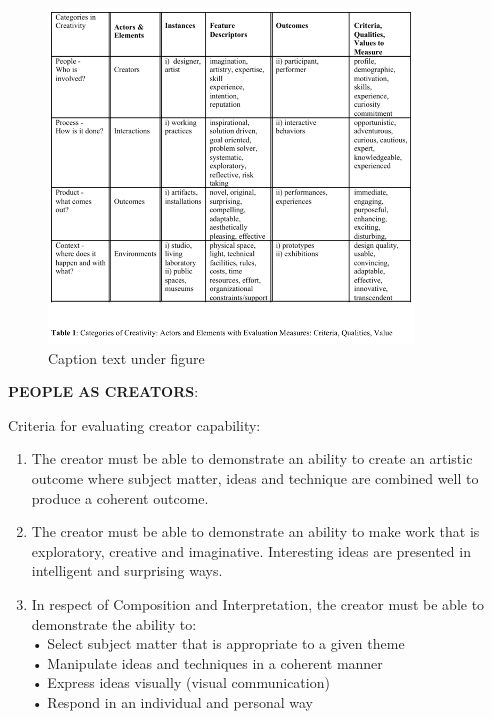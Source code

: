 \begin{figure}[htb] %
  \centering
  \includegraphics[width=\linewidth]{images/candy01.png}
\caption[Text for Table of Contents]{Caption text under figure}
\label{fig:candy01}
\end{figure}

\textbf{PEOPLE AS CREATORS}: \parencite[p.14-15]{Candy2012}

Criteria for evaluating creator capability:
\begin{enumerate}
  \item The creator must be able to demonstrate an ability to create an artistic outcome where subject matter, ideas and technique are combined well to produce a coherent outcome.
  \item The creator must be able to demonstrate an ability to make work that is exploratory, creative and imaginative. Interesting ideas are presented in intelligent and surprising ways.
  \item In respect of Composition and Interpretation, the creator must be able to demonstrate the ability to:\\
  •	Select subject matter that is appropriate to a given theme\\
  •	Manipulate ideas and techniques in a coherent manner\\
  •	Express ideas visually (visual communication)\\
  •	Respond in an individual and personal way
\end{enumerate}

